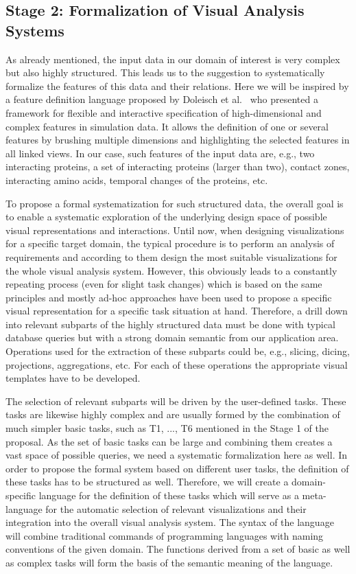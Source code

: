 \documentclass[11pt,a4paper,titlepage,oneside,onecolumn]{article}
\begin{document}
\subsection{Stage 2: Formalization of Visual Analysis Systems}
As already mentioned, the input data in our domain of interest is very complex but also highly structured.
This leads us to the suggestion to systematically formalize the features of this data and their relations.
Here we will be inspired by a feature definition language proposed by Doleisch et al.~\cite{Doleisch} who presented a framework for flexible and interactive specification of high-dimensional and complex features in simulation data.
It allows the definition of one or several features by brushing multiple dimensions and highlighting the selected features in all linked views.
In our case, such features of the input data are, e.g., two interacting proteins, a set of interacting proteins (larger than two), contact zones, interacting amino acids, temporal changes of the proteins, etc. 

To propose a formal systematization for such structured data, the overall goal is to enable a systematic exploration of the underlying design space of possible visual representations and interactions.
Until now, when designing visualizations for a specific target domain, the typical procedure is to perform an analysis of requirements and according to them design the most suitable visualizations for the whole visual analysis system. 
However, this obviously leads to a constantly repeating process (even for slight task changes) which is based on the same principles and mostly ad-hoc approaches have been used to propose a specific visual representation for a specific task situation at hand.
Therefore, a drill down into relevant subparts of the highly structured data must be done with typical database queries but with a strong domain semantic from our application area. 
Operations used for the extraction of these subparts could be, e.g., slicing, dicing, projections, aggregations, etc. 
For each of these operations the appropriate visual templates have to be developed.

The selection of relevant subparts will be driven by the user-defined tasks.
These tasks are likewise highly complex and are usually formed by the combination of much simpler basic tasks, such as T1, ..., T6 mentioned in the Stage 1 of the proposal. 
As the set of basic tasks can be large and combining them creates a vast space of possible queries, we need a systematic formalization here as well.
In order to propose the formal system based on different user tasks, the definition of these tasks has to be structured as well. 
Therefore, we will create a domain-specific language for the definition of these tasks which will serve as a meta-language for the automatic selection of relevant visualizations and their integration into the overall visual analysis system.
The syntax of the language will combine traditional commands of programming languages with naming conventions of the given domain.
The functions derived from a set of basic as well as complex tasks will form the basis of the semantic meaning of the language.
\end{document}
